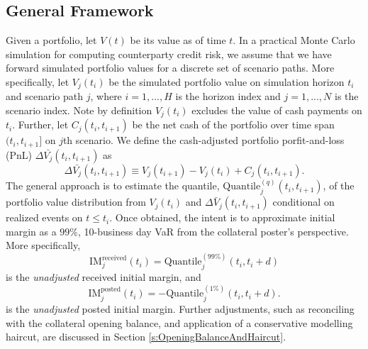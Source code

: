 \documentclass[preprint,12pt]{elsarticle}
\begin{document}
\subsection{General Framework}\label{s:GeneralFramework}
Given a portfolio, let $V(t)$  be its value as of time $t$. In a practical Monte Carlo simulation for computing counterparty credit risk, we assume that we have forward simulated portfolio values for a discrete set of scenario paths. More specifically, let $V_{j}(t_{i})$ be the simulated portfolio value on simulation horizon $t_{i}$ and scenario path $j$, where $i=1,...,H$ is the horizon index and $j=1,...,N$ is the scenario index. Note by definition $V_{j}(t_{i})$ excludes the value of cash payments on $t_{i}$. Further, let $C_{j}(t_{i},t_{i+1})$ be the net cash of the portfolio over time span $(t_{i},t_{i+1}]$ on $j$th scenario. We define the cash-adjusted portfolio porfit-and-loss (PnL) $\Delta\bar{V_{j}}(t_{i},t_{i+1})$ as
\begin{equation}
\Delta\bar{V_{j}}(t_{i},t_{i+1})\equiv V_{j}(t_{i+1})-V_{j}(t_{i})+C_{j}(t_{i},t_{i+1}).
\end{equation}
The general approach is to estimate the quantile, $\textrm{Quantile}_{j}^{(q)}(t_{i},t_{i+1})$, of the portfolio value distribution from $V_{j}(t_{i})$ and $\Delta\bar{V}_{j}(t_{i},t_{i+1})$ conditional on realized events on $t \le t_i$. Once obtained, the intent is to approximate initial margin as a $99\%$, 10-business day VaR from the collateral poster's perspective. More specifically, 
\begin{equation}\label{eq:unadjustedReceivedIM}
\textrm{IM}_{j}^{\textrm{received}}(t_{i})=\textrm{Quantile}_{j}^{(99\%)}(t_{i},t_{i}+d)
\end{equation}
is the \emph{unadjusted} received initial margin, and 
\begin{equation}\label{eq:unadjustedPostedIM}
\textrm{IM}_{j}^{\textrm{posted}}(t_{i})=-\textrm{Quantile}_{j}^{(1\%)}(t_{i},t_{i}+d).
\end{equation}
is the \emph{unadjusted} posted initial margin. Further adjustments, such as reconciling with the collateral opening balance, and application of a conservative modelling haircut, are discussed in Section \ref{s:OpeningBalanceAndHaircut}. 
\end{document}
